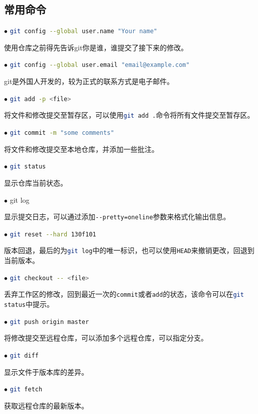		\subsection{常用命令}
			\par $\bullet$ \lstinline[language=sh]{git config --global user.name "Your name"}
			\par 使用仓库之前得先告诉git你是谁，谁提交了接下来的修改。
			\par $\bullet$ \lstinline[language=sh]{git config --global user.email "email@example.com"}
			\par git是外国人开发的，较为正式的联系方式是电子邮件。
			\par $\bullet$ \lstinline[language=sh]{git add -p <file>}
			\par 将文件和修改提交至暂存区，可以使用\lstinline[language=sh]{git add .}命令将所有文件提交至暂存区。
			\par $\bullet$ \lstinline[language=sh]{git commit -m "some comments"}
			\par 将文件和修改提交至本地仓库，并添加一些批注。
			\par $\bullet$ \lstinline[language=sh]{git status}
			\par 显示仓库当前状态。
			\par $\bullet$ \lstinline[language=sh]{}git log
			\par 显示提交日志，可以通过添加\lstinline[language=sh]{--pretty=oneline}参数来格式化输出信息。
			\par $\bullet$ \lstinline[language=sh]{git reset --hard 130f101}
			\par 版本回退，最后的为\lstinline[language=sh]{git log}中的唯一标识，也可以使用\lstinline[language=sh]{HEAD}来撤销更改，回退到当前版本。
			\par $\bullet$ \lstinline[language=sh]{git checkout -- <file>}
			\par 丢弃工作区的修改，回到最近一次的\lstinline[language=sh]{commit}或者\lstinline[language=sh]{add}的状态，该命令可以在\lstinline[language=sh]{git status}中提示。
			\par $\bullet$ \lstinline[language=sh]{git push origin master}
			\par 将修改提交至远程仓库，可以添加多个远程仓库，可以指定分支。
			\par $\bullet$ \lstinline[language=sh]{git diff}
			\par 显示文件于版本库的差异。
			\par $\bullet$ \lstinline[language=sh]{git fetch}
			\par 获取远程仓库的最新版本。
